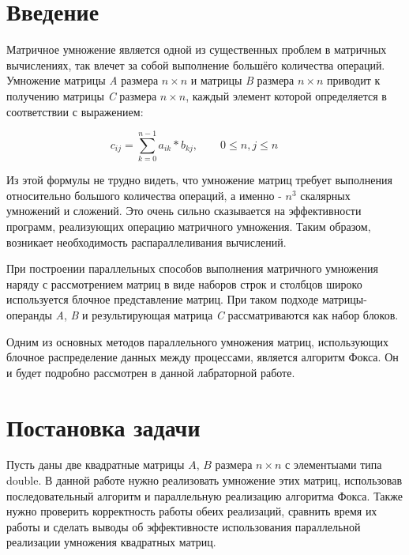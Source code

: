 \documentclass{report}
\begin{document}
\setcounter{page}{2}

\tableofcontents
\newpage

\section*{Введение}
Матричное умножение является одной из существенных проблем в матричных
вычислениях, так влечет за собой выполнение большёго количества операций. Умножение матрицы {\itshape A} размера {\itshape $n \times n$} и матрицы {\itshape B} размера {\itshape $n \times n$} приводит к получению матрицы {\itshape C} размера {\itshape $n \times n$}, каждый элемент которой определяется в соответствии с выражением:
\par$$
    c_{ij} = \sum_{k=0}^{n-1} a_{ik} * b_{kj},\qquad 0 \le n,j \le n \qquad
    $$

Из этой формулы не трудно видеть, что умножение матриц требует выполнения относительно большого количества операций, а именно - $n^3$ скалярных умножений и сложений. Это очень сильно сказывается на эффективности программ, реализующих операцию матричного умножения. Таким образом, возникает необходимость распараллеливания вычислений.
\par При построении параллельных способов выполнения матричного умножения наряду с
рассмотрением матриц в виде наборов строк и столбцов широко используется блочное
представление матриц. При таком подходе матрицы-операнды {\itshape A}, {\itshape B} и результирующая
матрица {\itshape C} рассматриваются как набор блоков. 
\par Одним из основных методов параллельного умножения матриц, использующих блочное
распределение данных между процессами, является алгоритм Фокса. Он и будет подробно
рассмотрен в данной лабраторной работе.

\newpage

\section*{Постановка задачи}
Пусть даны две квадратные матрицы {\itshape $A$}, {\itshape $B$} размера {\itshape $n \times n$} с элементыами типа double. В данной работе нужно реализовать умножение этих матриц, использовав последовательный алгоритм и параллельную реализацию алгоритма Фокса. Также нужно проверить корректность работы обеих реализаций, сравнить время их работы и сделать выводы об эффективносте использования параллельной реализации умножения квадратных матриц.
\end{document}
